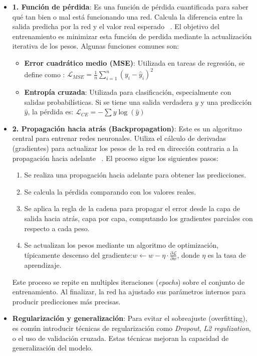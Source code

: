 \documentclass[11pt]{article} %
\begin{document}
\begin{itemize}
\item\textbf{1. Función de pérdida}:\newline
Es una función de pérdida cuantificada para saber qué tan bien o mal está funcionando una red. Calcula la diferencia entre la salida predicha por la red y el valor real esperado ~\cite{zhou2020graph}. El objetivo del entrenamiento es minimizar esta función de perdida mediante la actualización iterativa de los pesos. \newline Algunas funciones comunes son:
\begin{itemize}
    \item \textbf{Error cuadrático medio (MSE)}: Utilizada en tareas de regresión, se define como : $\mathcal{L}_{MSE} = \frac{1}{n} \sum_{i=1}^{n}(y_i - \hat{y}_i)^2$
    \item \textbf{Entropía cruzada}: Utilizada para clasificación, especialmente con salidas probabilísticas. Si se tiene una salida verdadera $y$ y una predicción $\hat{y}$, la pérdida es: $\mathcal{L}_{CE} = -\sum y \log(\hat{y})$
\end{itemize}

\item\textbf{2. Propagación hacia atrás (Backpropagation)}:\newline
Este es un algoritmo central para entrenar redes neuronales. Utiliza el cálculo de derivadas (gradientes) para actualizar los pesos de la red en dirección contraria a la propagación hacia adelante ~\cite{nvidia}. El proceso sigue los siguientes pasos:
\begin{enumerate}
    \item Se realiza una propagación hacia adelante para obtener las predicciones.
    \item Se calcula la pérdida comparando con los valores reales.
    \item Se aplica la regla de la cadena para propagar el error desde la capa de salida hacia atrás, capa por capa, computando los gradientes parciales con respecto a cada peso.
    \item Se actualizan los pesos mediante un algoritmo de optimización, típicamente descenso del gradiente:$w \leftarrow w - \eta \cdot \frac{\partial \mathcal{L}}{\partial w}$, donde $\eta$ es la tasa de aprendizaje.
\end{enumerate}
Este proceso se repite en multiples iteraciones (\textit{epochs}) sobre el conjunto de entrenamiento. Al finalizar, la red ha ajustado sus parámetros internos para producir predicciones más precisas.

\item \textbf{Regularización y generalización}: \newline
Para evitar el sobreajuste (overfitting), es común introducir técnicas de regularización como \textit{Dropout}, \textit{L2 regulization}, o el uso de validación cruzada. Estas técnicas mejoran la capacidad de generalización del modelo.
\end{itemize}
\end{document}
